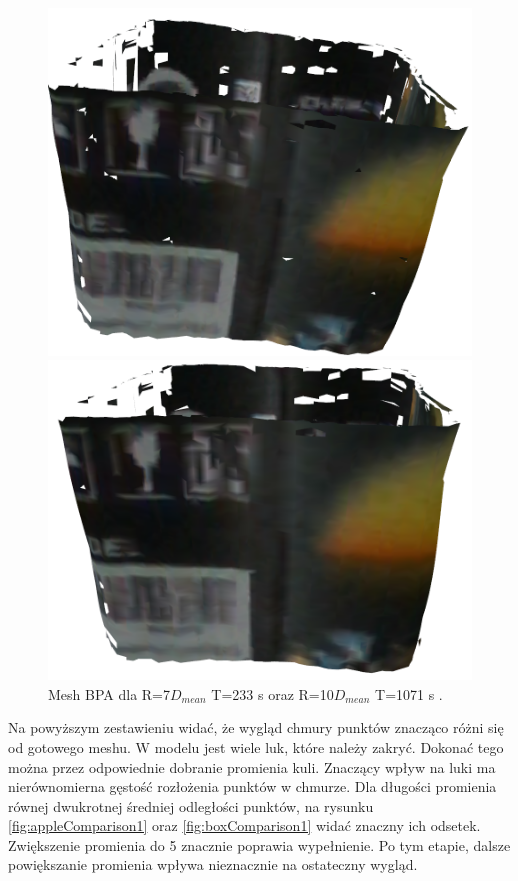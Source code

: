 \begin{figure}[H]
\centering
    \begin{minipage}[b]{0.45\linewidth}
        \includegraphics[scale=0.3]{bpaBox7x.PNG}
    \end{minipage}
\quad
    \begin{minipage}[b]{0.45\linewidth}
        \includegraphics[scale=0.3]{bpaBox10x.PNG}
    \end{minipage}
\caption{Mesh BPA dla R=7$D_{mean}$ T=233 s oraz R=10$D_{mean}$ T=1071 s .}
\label{fig:boxComparison2}
\end{figure}
Na powyższym zestawieniu widać, że wygląd chmury punktów znacząco różni się od gotowego meshu. W modelu jest wiele luk, które należy zakryć. Dokonać tego można przez odpowiednie dobranie promienia kuli. Znaczący wpływ na luki ma nierównomierna gęstość rozłożenia punktów w chmurze. Dla długości promienia równej dwukrotnej średniej odległości punktów, na rysunku \ref{fig:appleComparison1} oraz \ref{fig:boxComparison1} widać znaczny ich odsetek. Zwiększenie promienia do 5 znacznie poprawia wypełnienie. Po tym etapie, dalsze powiększanie promienia wpływa nieznacznie na ostateczny wygląd.

